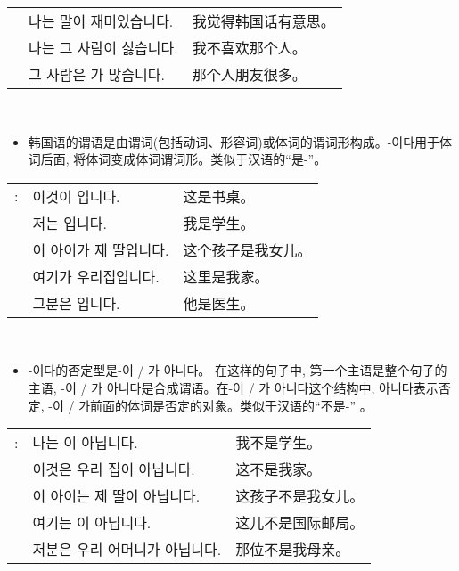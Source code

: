 \begin{grammar}
\begin{grammarsect}[\kr -이 / -가]
\begin{tabular}{lll}
			                 & \kr 나는 \ruby{韓國}{한국}말이 재미있습니다. & 我觉得韩国话有意思。 \\
			                 & \kr 나는 그 사람이 싫습니다.             & 我不喜欢那个人。   \\
			                 & \kr 그 사람은 \ruby{親舊}{친구}가 많습니다. & 那个人朋友很多。
		\end{tabular}\\
	\end{grammarsect}
	\begin{grammarsect}[\kr -이다]
		\begin{itemize}
			\item 韩国语的谓语是由谓词(包括动词、形容词)或体词的谓词形构成。{\kr -이다}用于体词后面, 将体词变成体词谓词形。类似于汉语的“是-”。
		\end{itemize}
		\begin{tabular}{lll}
			\kr \ruby{例}{예}: & \kr 이것이 \ruby{冊床}{책상}입니다. & 这是书桌。     \\
			                 & \kr 저는 \ruby{學生}{학생}입니다.  & 我是学生。     \\
			                 & \kr 이 아이가 제 딸입니다.         & 这个孩子是我女儿。 \\
			                 & \kr 여기가 우리집입니다.           & 这里是我家。    \\
			                 & \kr 그분은 \ruby{醫師}{의사}입니다. & 他是医生。
		\end{tabular}\\
	\end{grammarsect}
	\begin{grammarsect}
		\begin{itemize}
			\item {\kr -이다}的否定型是{\kr -이 / 가 아니다}。 在这样的句子中, 第一个主语是整个句子的主语, {\kr -이 / 가 아니다}是合成谓语。在{\kr -이 / 가 아니다}这个结构中, {\kr 아니다}表示否定, {\kr -이 / 가}前面的体词是否定的对象。类似于汉语的“不是-” 。
		\end{itemize}
		\begin{tabular}{lll}
			\kr \ruby{例}{예}: & \kr 나는 \ruby{學生}{학생}이 아닙니다.        & 我不是学生。    \\
			                 & \kr 이것은 우리 집이 아닙니다.                & 这不是我家。    \\
			                 & \kr 이 아이는 제 딸이 아닙니다.               & 这孩子不是我女儿。 \\
			                 & \kr 여기는 \ruby{國際郵遞局}{국제우체국}이 아닙니다. & 这儿不是国际邮局。 \\
			                 & \kr 저분은 우리 어머니가 아닙니다.              & 那位不是我母亲。
		\end{tabular}\\
	\end{grammarsect}
\end{grammar}
